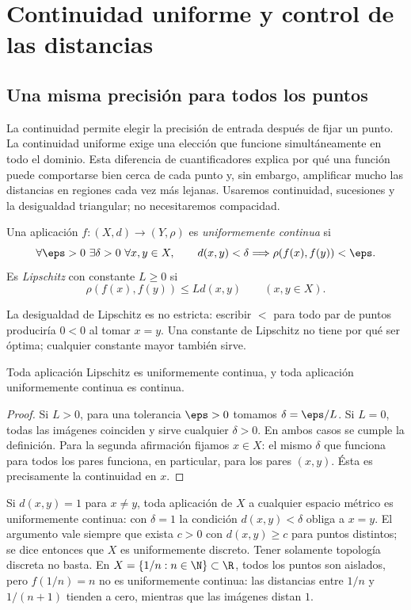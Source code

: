 \chapter{Continuidad uniforme y control de las distancias}\label{chap:07}
\section{Una misma precisión para todos los puntos}
La continuidad permite elegir la precisión de entrada después de fijar un punto. La continuidad uniforme exige una elección que funcione simultáneamente en todo el dominio. Esta diferencia de cuantificadores explica por qué una función puede comportarse bien cerca de cada punto y, sin embargo, amplificar mucho las distancias en regiones cada vez más lejanas. Usaremos continuidad, sucesiones y la desigualdad triangular; no necesitaremos compacidad.

\begin{definicion}\label{ch07:def-uniforme}
Una aplicación $f:(X,d)\to(Y,\rho)$ es \emph{uniformemente continua} si
\[
 \forall\eps>0\ \exists\delta>0\ \forall x,y\in X,
 \qquad d(x,y)<\delta\Longrightarrow\rho(f(x),f(y))<\eps.
\]
Es \emph{Lipschitz} con constante $L\geq0$ si
\[
 \rho(f(x),f(y))\leq Ld(x,y)\qquad(x,y\in X).
\]
\end{definicion}
La desigualdad de Lipschitz es no estricta: escribir $<$ para todo par de puntos produciría $0<0$ al tomar $x=y$. Una constante de Lipschitz no tiene por qué ser óptima; cualquier constante mayor también sirve.

\begin{proposicion}\label{ch07:lip-uniforme}
Toda aplicación Lipschitz es uniformemente continua, y toda aplicación uniformemente continua es continua.
\end{proposicion}
\begin{proof}
Si $L>0$, para una tolerancia $\eps>0$ tomamos $\delta=\eps/L$. Si $L=0$, todas las imágenes coinciden y sirve cualquier $\delta>0$. En ambos casos se cumple la definición. Para la segunda afirmación fijamos $x\in X$: el mismo $\delta$ que funciona para todos los pares funciona, en particular, para los pares $(x,y)$. Ésta es precisamente la continuidad en $x$.
\end{proof}

\begin{ejemplo}
Si $d(x,y)=1$ para $x\ne y$, toda aplicación de $X$ a cualquier espacio métrico es uniformemente continua: con $\delta=1$ la condición $d(x,y)<\delta$ obliga a $x=y$. El argumento vale siempre que exista $c>0$ con $d(x,y)\geq c$ para puntos distintos; se dice entonces que $X$ es uniformemente discreto. Tener solamente topología discreta no basta. En $X=\{1/n:n\in\N\}\subset\R$, todos los puntos son aislados, pero $f(1/n)=n$ no es uniformemente continua: las distancias entre $1/n$ y $1/(n+1)$ tienden a cero, mientras que las imágenes distan $1$.
\end{ejemplo}

